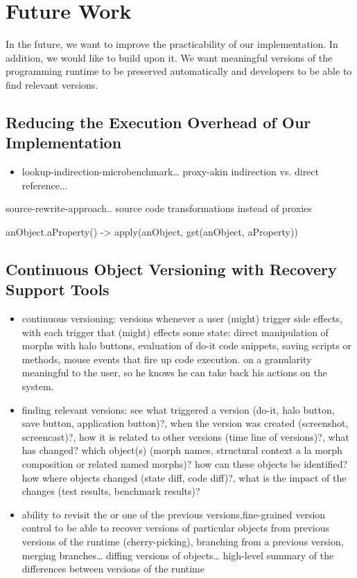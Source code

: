 \chapter{Future Work} \label{sec:FUTURE_WORK}

In the future, we want to improve the practicability of our implementation.
In addition, we would like to build upon it.
We want meaningful versions of the programming runtime to be preserved automatically and developers to be able to find relevant versions.

\section{Reducing the Execution Overhead of Our Implementation}

\begin{itemize}
    \item lookup-indirection-microbenchmark… proxy-akin indirection vs. direct reference...
\end{itemize}

source-rewrite-approach.. source code transformations instead of proxies

anObject.aProperty() -> apply(anObject, get(anObject, aProperty))


\section{Continuous Object Versioning with Recovery Support Tools}

\begin{itemize}
    \item continuous versioning: versions whenever a user (might) trigger side effects, with each trigger that (might) effects some state: direct manipulation of morphs with halo buttons, evaluation of do-it code snippets, saving scripts or methods, mouse events that fire up code execution.
on a granularity meaningful to the user, so he knows he can take back his actions on the system.
    \item finding relevant versions: see what triggered a version (do-it, halo button, save button, application button)?, when the version was created (screenshot, screencast)?, how it is related to other versions (time line of versions)?, what has changed? which object(s) (morph names, structural context a la morph composition or related named morphs)? how can these objects be identified? how where objects changed (state diff, code diff)?, what is the impact of the changes (test results, benchmark results)?
    \item ability to revisit the or one of the previous versions,fine-grained version control to be able to recover versions of particular objects from previous versions of the runtime (cherry-picking), branching from a previous version, merging branches… diffing versions of objects… high-level summary of the differences between versions of the runtime
\end{itemize}
